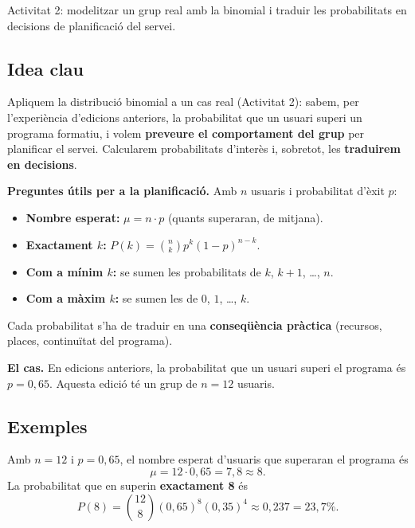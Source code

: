 %
{Activitat 2: modelitzar un grup real amb la binomial i traduir les probabilitats en decisions de planificació del servei.}

\subsection{Idea clau}

Apliquem la distribució binomial a un cas real (Activitat 2): sabem, per l'experiència
d'edicions anteriors, la probabilitat que un usuari superi un programa formatiu, i volem
\textbf{preveure el comportament del grup} per planificar el servei. Calcularem
probabilitats d'interès i, sobretot, les \textbf{traduirem en decisions}.

\begin{idea}
\textbf{Preguntes útils per a la planificació.} Amb $n$ usuaris i probabilitat d'èxit
$p$:
\begin{itemize}[leftmargin=1.4em, itemsep=2pt]
  \item \textbf{Nombre esperat:} $\mu=n\cdot p$ (quants superaran, de mitjana).
  \item \textbf{Exactament $k$:} $P(k)=\binom{n}{k}p^{k}(1-p)^{n-k}$.
  \item \textbf{Com a mínim $k$:} se sumen les probabilitats de $k$, $k+1$, \dots, $n$.
  \item \textbf{Com a màxim $k$:} se sumen les de $0$, $1$, \dots, $k$.
\end{itemize}
Cada probabilitat s'ha de traduir en una \textbf{conseqüència pràctica} (recursos,
places, continuïtat del programa).
\end{idea}

\noindent\textbf{El cas.} En edicions anteriors, la probabilitat que un usuari superi el
programa és $p=0,65$. Aquesta edició té un grup de $n=12$ usuaris.

\subsection{Exemples}

\begin{exemple}
Amb $n=12$ i $p=0,65$, el nombre esperat d'usuaris que superaran el programa és
\[
\mu=12\cdot 0,65=7,8\approx 8.
\]
La probabilitat que en superin \textbf{exactament 8} és
\[
P(8)=\binom{12}{8}(0,65)^{8}(0,35)^{4}\approx 0,237=23,7\%.
\]
\end{exemple}

